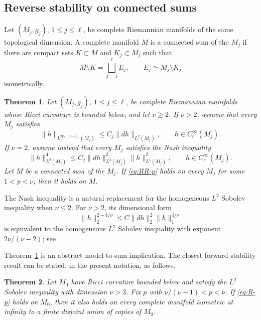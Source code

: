 \documentclass[12pt]{amsart}
\newtheorem{theorem}{Theorem}[section]
\theoremstyle{remark}
\begin{document}
\subsection*{Reverse stability on connected sums}

Let $(M_j,g_j)$, $1\leq j\leq \ell$, be complete Riemannian manifolds of
the same topological dimension.  A complete manifold $M$ is a connected
sum of the $M_j$ if there are compact sets $K\subset M$ and
$K_j\subset M_j$ such that
\[
 M\setminus K=\bigsqcup_{j=1}^{\ell}E_j,
 \qquad E_j\simeq M_j\setminus K_j
\]
isometrically.  




\begin{theorem}
\label{thm:intro-connected}
Let $(M_j,g_j)$, $1\leq j\leq\ell$, be complete Riemannian manifolds
whose Ricci curvature is bounded below, and let $\nu\geq2$.
If $\nu>2$, assume that every $M_j$ satisfies
\[
 \|h\|_{L^{2\nu/(\nu-2)}(M_j)}
 \leq C_j\|dh\|_{L^2(M_j)},
 \qquad h\in C_c^\infty(M_j).
\]
If $\nu=2$, assume instead that every $M_j$ satisfies the Nash inequality
\[
 \|h\|_{L^2(M_j)}^4
 \leq C_j\|dh\|_{L^2(M_j)}^2\|h\|_{L^1(M_j)}^2,
 \qquad h\in C_c^\infty(M_j).
\]
Let $M$ be a connected sum of the $M_j$.
If \eqref{eq:RR-p} holds on every $M_j$ for some $1<p<\nu$,
then it holds on $M$.
\end{theorem}

The Nash inequality is a natural replacement for the homogeneous
$L^2$ Sobolev inequality when $\nu\leq2$.
For $\nu>2$, its dimensional form
\[
 \|h\|_2^{2+4/\nu}
 \leq C\|dh\|_2^2\|h\|_1^{4/\nu}
\]
is equivalent to the homogeneous $L^2$ Sobolev inequality with exponent
$2\nu/(\nu-2)$; see \cite{BCLS95}.


Theorem~\ref{thm:intro-connected} is an abstract model-to-sum implication.
The closest forward stability result can be stated, in the present
notation, as follows.

\begin{theorem}\cite[Theorem~1.3]{Carron07}
Let $M_0$ have Ricci curvature bounded below and satisfy the $L^2$ Sobolev
inequality with dimension $\nu>3$.
Fix $p$ with $\nu/(\nu-1)<p<\nu$.  If \eqref{eq:R-p} holds on $M_0$,
then it also holds on every complete manifold
isometric at infinity to a finite disjoint union of copies of $M_0$.
\end{theorem}
\end{document}
